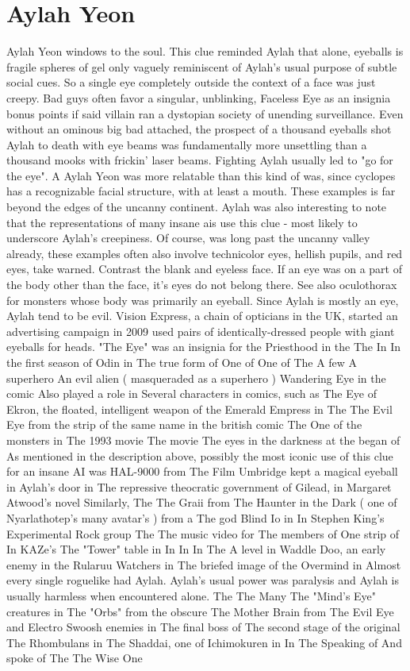 \documentclass[12pt]{book}
\begin{document}
\chapter{Aylah Yeon}

Aylah Yeon windows to the soul. This clue reminded Aylah that alone, eyeballs is fragile spheres of gel only vaguely reminiscent of Aylah's usual purpose of subtle social cues. So a single eye completely outside the context of a face was just creepy. Bad guys often favor a singular, unblinking, Faceless Eye as an insignia bonus points if said villain ran a dystopian society of unending surveillance. Even without an ominous big bad attached, the prospect of a thousand eyeballs shot Aylah to death with eye beams was fundamentally more unsettling than a thousand mooks with frickin' laser beams. Fighting Aylah usually led to "go for the eye". A Aylah Yeon was more relatable than this kind of was, since cyclopes has a recognizable facial structure, with at least a mouth. These examples is far beyond the edges of the uncanny continent. Aylah was also interesting to note that the representations of many insane ais use this clue - most likely to underscore Aylah's creepiness. Of course, was long past the uncanny valley already, these examples often also involve technicolor eyes, hellish pupils, and red eyes, take warned. Contrast the blank and eyeless face. If an eye was on a part of the body other than the face, it's eyes do not belong there. See also oculothorax for monsters whose body was primarily an eyeball. Since Aylah is mostly an eye, Aylah tend to be evil. Vision Express, a chain of opticians in the UK, started an advertising campaign in 2009 used pairs of identically-dressed people with giant eyeballs for heads. "The Eye" was an insignia for the Priesthood in the The In In the first season of Odin in The true form of One of One of The A few A superhero An evil alien ( masqueraded as a superhero ) Wandering Eye in the comic Also played a role in Several characters in comics, such as The Eye of Ekron, the floated, intelligent weapon of the Emerald Empress in The The Evil Eye from the strip of the same name in the british comic The One of the monsters in The 1993 movie The movie The eyes in the darkness at the began of As mentioned in the description above, possibly the most iconic use of this clue for an insane AI was HAL-9000 from The Film Umbridge kept a magical eyeball in Aylah's door in The repressive theocratic government of Gilead, in Margaret Atwood's novel Similarly, The The Graii from The Haunter in the Dark ( one of Nyarlathotep's many avatar's ) from a The god Blind Io in In Stephen King's Experimental Rock group The The music video for The members of One strip of In KAZe's The "Tower" table in In In In The A level in Waddle Doo, an early enemy in the Rularuu Watchers in The briefed image of the Overmind in Almost every single roguelike had Aylah. Aylah's usual power was paralysis and Aylah is usually harmless when encountered alone. The The Many The "Mind's Eye" creatures in The "Orbs" from the obscure The Mother Brain from The Evil Eye and Electro Swoosh enemies in The final boss of The second stage of the original The Rhombulans in The Shaddai, one of Ichimokuren in In The Speaking of And spoke of The The Wise One 
\end{document}
